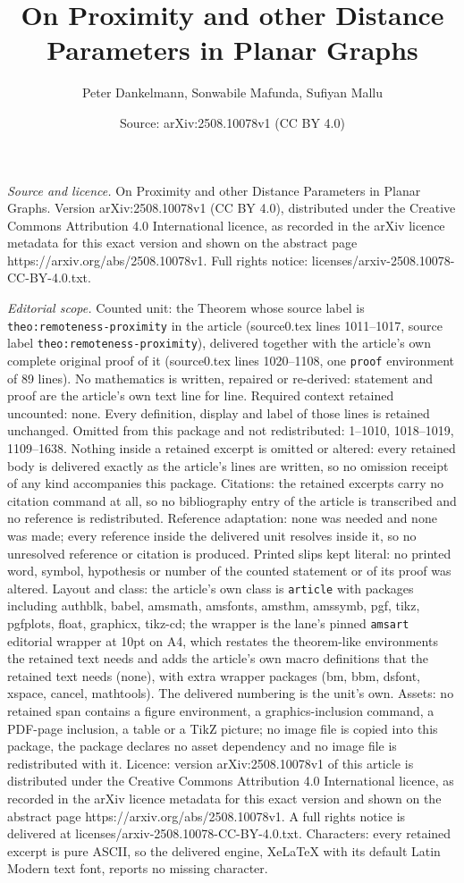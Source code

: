 \documentclass[10pt,a4paper]{amsart}
\title[On Proximity and other Distance Parameters in Planar Graphs]{On Proximity and other Distance Parameters in Planar Graphs}
\author{Peter Dankelmann, Sonwabile Mafunda, Sufiyan Mallu}
\date{Source: arXiv:2508.10078v1 (CC BY 4.0)}
\begin{document}
\maketitle

\noindent\emph{Source and licence.} On Proximity and other Distance Parameters in Planar Graphs. Version arXiv:2508.10078v1 (CC BY 4.0), distributed under the Creative Commons Attribution 4.0 International licence, as recorded in the arXiv licence metadata for this exact version and shown on the abstract page https://arxiv.org/abs/2508.10078v1. Full rights notice: licenses/arxiv-2508.10078-CC-BY-4.0.txt.\par\smallskip

\noindent\textit{Editorial scope.} Counted unit: the Theorem whose source label is \texttt{theo:remoteness-proximity} in the article (source0.tex lines 1011--1017, source label \texttt{theo:remoteness-proximity}), delivered together with the article's own complete original proof of it (source0.tex lines 1020--1108, one \texttt{proof} environment of 89 lines). No mathematics is written, repaired or re-derived: statement and proof are the article's own text line for line. Required context retained uncounted: none. Every definition, display and label of those lines is retained unchanged. Omitted from this package and not redistributed: 1--1010, 1018--1019, 1109--1638. Nothing inside a retained excerpt is omitted or altered: every retained body is delivered exactly as the article's lines are written, so no omission receipt of any kind accompanies this package. Citations: the retained excerpts carry no citation command at all, so no bibliography entry of the article is transcribed and no reference is redistributed. Reference adaptation: none was needed and none was made; every reference inside the delivered unit resolves inside it, so no unresolved reference or citation is produced. Printed slips kept literal: no printed word, symbol, hypothesis or number of the counted statement or of its proof was altered. Layout and class: the article's own class is \texttt{article} with packages including authblk, babel, amsmath, amsfonts, amsthm, amssymb, pgf, tikz, pgfplots, float, graphicx, tikz-cd; the wrapper is the lane's pinned \texttt{amsart} editorial wrapper at 10pt on A4, which restates the theorem-like environments the retained text needs and adds the article's own macro definitions that the retained text needs (none), with extra wrapper packages (bm, bbm, dsfont, xspace, cancel, mathtools). The delivered numbering is the unit's own. Assets: no retained span contains a figure environment, a graphics-inclusion command, a PDF-page inclusion, a table or a TikZ picture; no image file is copied into this package, the package declares no asset dependency and no image file is redistributed with it. Licence: version arXiv:2508.10078v1 of this article is distributed under the Creative Commons Attribution 4.0 International licence, as recorded in the arXiv licence metadata for this exact version and shown on the abstract page https://arxiv.org/abs/2508.10078v1. A full rights notice is delivered at licenses/arxiv-2508.10078-CC-BY-4.0.txt. Characters: every retained excerpt is pure ASCII, so the delivered engine, XeLaTeX with its default Latin Modern text font, reports no missing character.
\end{document}
